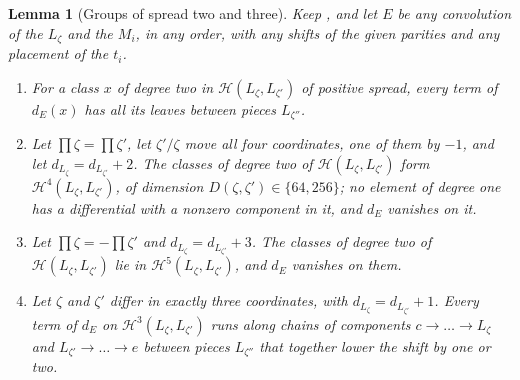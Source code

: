 \documentclass[11pt,reqno]{amsart}
\theoremstyle{plain}
\newtheorem{lemma}[theorem]{Lemma}
\theoremstyle{definition}
\theoremstyle{remark}
\newcommand{\cH}{\mathcal{H}}
\begin{document}
\begin{lemma}[Groups of spread two and three]\label{lem:efourspread}
Keep , and let $E$ be any convolution of the
$L_{\zeta}$ and the $M_{i}$, in any order, with any shifts of the given
parities and any placement of the $t_{i}$.
\begin{enumerate}[label=\textup{(\roman*)},leftmargin=2.6em,itemsep=2pt]
\item For a class $x$ of degree two in $\cH(L_{\zeta},L_{\zeta'})$ of
  positive spread, every term of $d_{E}(x)$ has all its leaves between
  pieces $L_{\zeta''}$.
\item Let $\prod\zeta=\prod\zeta'$, let $\zeta'/\zeta$ move all four
  coordinates, one of them by $-1$, and let $d_{L_{\zeta}}=d_{L_{\zeta'}}+2$.
  The classes of degree two of $\cH(L_{\zeta},L_{\zeta'})$ form
  $\cH^{4}(L_{\zeta},L_{\zeta'})$, of dimension $D(\zeta,\zeta')\in\{64,256\}$;
  no element of degree one has a differential with a nonzero component in
  it, and $d_{E}$ vanishes on it.
\item Let $\prod\zeta=-\prod\zeta'$ and $d_{L_{\zeta}}=d_{L_{\zeta'}}+3$. The
  classes of degree two of $\cH(L_{\zeta},L_{\zeta'})$ lie in
  $\cH^{5}(L_{\zeta},L_{\zeta'})$, and $d_{E}$ vanishes on them.
\item Let $\zeta$ and $\zeta'$ differ in exactly three coordinates, with
  $d_{L_{\zeta}}=d_{L_{\zeta'}}+1$. Every term of $d_{E}$ on
  $\cH^{3}(L_{\zeta},L_{\zeta'})$ runs along chains of components
  $c\to\dots\to L_{\zeta}$ and $L_{\zeta'}\to\dots\to e$ between pieces
  $L_{\zeta''}$ that together lower the shift by one or two.
\end{enumerate}
\end{lemma}
\end{document}
